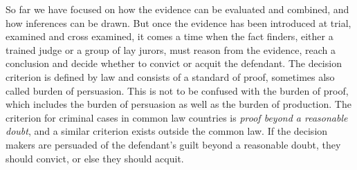 \documentclass[10pt]{article}
\begin{document}
So far we have focused on how the evidence can be evaluated and combined, and how inferences can be drawn. 
But once the evidence has been introduced at trial, examined and cross examined, it comes a time when the fact finders, either a 
trained judge or a group of lay jurors, must reason from the evidence, reach a conclusion and decide 
whether to convict or acquit the defendant. 
%
The decision criterion is defined by law 
and consists of a standard of proof, sometimes also called burden of persuasion. This is not to be confused with 
the burden of proof, which includes the burden of persuasion as well as the burden of production.
The criterion for criminal cases in common law countries is 
\textit{proof beyond a reasonable doubt}, and a similar criterion exists outside the common law.
 If the decision makers are persuaded of the defendant's guilt beyond a reasonable doubt, 
 they should convict, or else they should acquit.  
\end{document}
